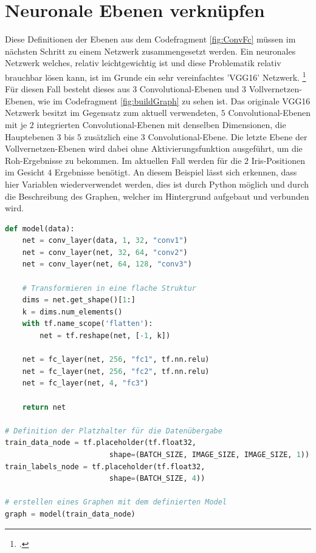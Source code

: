 \section{Neuronale Ebenen verknüpfen}

Diese Definitionen der Ebenen aus dem Codefragment \ref{fig:ConvFc} müssen im nächsten Schritt zu einem Netzwerk zusammengesetzt werden. 
Ein neuronales Netzwerk welches, relativ leichtgewichtig ist und diese Problematik relativ brauchbar lösen kann, ist im Grunde ein sehr vereinfachtes 'VGG16' Netzwerk. \footcite{VGG16: https://arxiv.org/pdf/1409.1556.pdf}
Für diesen Fall besteht dieses aus $3$ Convolutional-Ebenen und $3$ Vollvernetzen-Ebenen, wie im Codefragment \ref{fig:buildGraph} zu sehen ist. 
Das originale VGG16 Netzwerk besitzt im Gegensatz zum aktuell verwendeten, $5$ Convolutional-Ebenen mit je $2$ integrierten Convolutional-Ebenen mit denselben Dimensionen, die Hauptebenen $3$ bis $5$ zusätzlich eine $3$ Convolutional-Ebene. 
Die letzte Ebene der Vollvernetzen-Ebenen wird dabei ohne Aktivierungsfunktion ausgeführt, um die Roh-Ergebnisse zu bekommen. 
Im aktuellen Fall werden für die $2$ Iris-Positionen im Gesicht $4$ Ergebnisse benötigt. 
An diesem Beispiel lässt sich erkennen, dass hier Variablen wiederverwendet werden, dies ist durch Python möglich und durch die Beschreibung des Graphen, welcher im Hintergrund aufgebaut und verbunden wird. 
\begin{lstlisting}[caption={Modeldefinition des Graphen},label=fig:buildGraph,captionpos=b,language=Python]
def model(data):
    net = conv_layer(data, 1, 32, "conv1")
    net = conv_layer(net, 32, 64, "conv2")
    net = conv_layer(net, 64, 128, "conv3")

    # Transformieren in eine flache Struktur
    dims = net.get_shape()[1:]
    k = dims.num_elements()
    with tf.name_scope('flatten'):
        net = tf.reshape(net, [-1, k])
    
    net = fc_layer(net, 256, "fc1", tf.nn.relu)    
    net = fc_layer(net, 256, "fc2", tf.nn.relu)
    net = fc_layer(net, 4, "fc3")
    
    return net
    
# Definition der Platzhalter für die Datenübergabe
train_data_node = tf.placeholder(tf.float32, 
						shape=(BATCH_SIZE, IMAGE_SIZE, IMAGE_SIZE, 1))
train_labels_node = tf.placeholder(tf.float32, 
						shape=(BATCH_SIZE, 4))

# erstellen eines Graphen mit dem definierten Model
graph = model(train_data_node)
\end{lstlisting}

